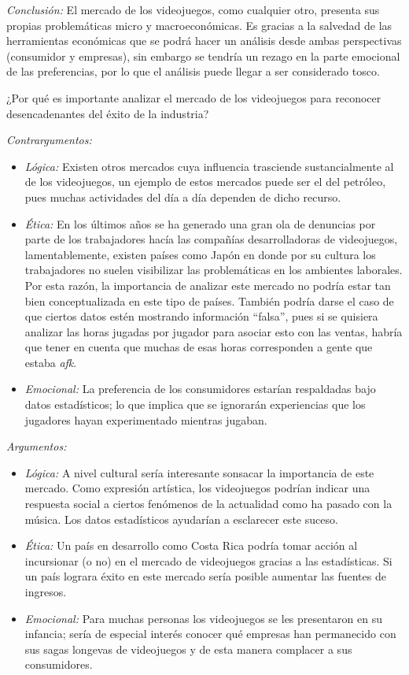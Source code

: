 \documentclass[
  letterpaper,
  DIV=11,
  numbers=noendperiod]{scrreprt}
\begin{document}
\emph{Conclusión:} El mercado de los videojuegos, como cualquier otro,
presenta sus propias problemáticas micro y macroeconómicas. Es gracias a
la salvedad de las herramientas económicas que se podrá hacer un
análisis desde ambas perspectivas (consumidor y empresas), sin embargo
se tendría un rezago en la parte emocional de las preferencias, por lo
que el análisis puede llegar a ser considerado tosco.

¿Por qué es importante analizar el mercado de los videojuegos para
reconocer desencadenantes del éxito de la industria?

\emph{Contrargumentos:}

\begin{itemize}
\item
  \emph{Lógica:} Existen otros mercados cuya influencia trasciende
  sustancialmente al de los videojuegos, un ejemplo de estos mercados
  puede ser el del petróleo, pues muchas actividades del día a día
  dependen de dicho recurso.
\item
  \emph{Ética:} En los últimos años se ha generado una gran ola de
  denuncias por parte de los trabajadores hacía las compañías
  desarrolladoras de videojuegos, lamentablemente, existen países como
  Japón en donde por su cultura los trabajadores no suelen visibilizar
  las problemáticas en los ambientes laborales. Por esta razón, la
  importancia de analizar este mercado no podría estar tan bien
  conceptualizada en este tipo de países. También podría darse el caso
  de que ciertos datos estén mostrando información ``falsa'', pues si se
  quisiera analizar las horas jugadas por jugador para asociar esto con
  las ventas, habría que tener en cuenta que muchas de esas horas
  corresponden a gente que estaba \emph{afk}.
\item
  \emph{Emocional:} La preferencia de los consumidores estarían
  respaldadas bajo datos estadísticos; lo que implica que se ignorarán
  experiencias que los jugadores hayan experimentado mientras jugaban.
\end{itemize}

\emph{Argumentos:}

\begin{itemize}
\item
  \emph{Lógica:} A nivel cultural sería interesante sonsacar la
  importancia de este mercado. Como expresión artística, los videojuegos
  podrían indicar una respuesta social a ciertos fenómenos de la
  actualidad como ha pasado con la música. Los datos estadísticos
  ayudarían a esclarecer este suceso.
\item
  \emph{Ética:} Un país en desarrollo como Costa Rica podría tomar
  acción al incursionar (o no) en el mercado de videojuegos gracias a
  las estadísticas. Si un país lograra éxito en este mercado sería
  posible aumentar las fuentes de ingresos.
\item
  \emph{Emocional:} Para muchas personas los videojuegos se les
  presentaron en su infancia; sería de especial interés conocer qué
  empresas han permanecido con sus sagas longevas de videojuegos y de
  esta manera complacer a sus consumidores.
\end{itemize}
\end{document}
